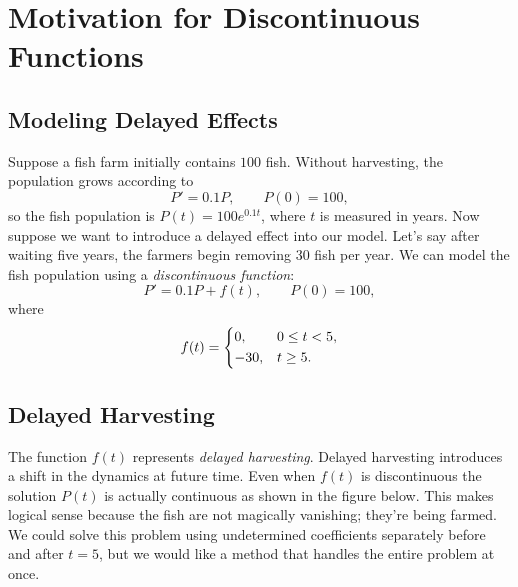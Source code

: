\documentclass[10pt,letterpaper]{article}
\begin{document}
\section{Motivation for Discontinuous Functions}

\subsection{Modeling Delayed Effects}
Suppose a fish farm initially contains $100$ fish.
Without harvesting, the population grows according to
\[
P'=0.1P,\qquad P(0)=100,
\]
so the fish population is $P(t)=100e^{0.1t}$, where $t$ is measured in years. Now suppose we want to introduce a delayed effect into our model. Let's say after waiting five years, the farmers begin removing $30$ fish per year. We can model the fish population using a \textit{discontinuous function}:
\[
P'=0.1P+f(t),\qquad P(0)=100,
\]
where
\[
f(t)=
\begin{dcases}
0, & 0\le t<5,\\
-30, & t\ge5.
\end{dcases}
\]
\subsection{Delayed Harvesting}
The function $f(t)$ represents \textit{delayed harvesting}. Delayed harvesting introduces a shift in the dynamics at future time. Even when $f(t)$ is discontinuous the solution $P(t)$ is actually continuous as shown in the figure below. This makes logical sense because the fish are not magically vanishing; they're being farmed. We could solve this problem using undetermined coefficients separately before and after $t=5$, but we would like a method
that handles the entire problem at once.
\end{document}
